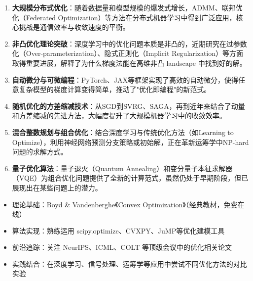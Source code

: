 \begin{conceptbox}[前沿研究方向]
\begin{enumerate}[label=\arabic*., leftmargin=2em]
    \item \textbf{大规模分布式优化}：随着数据量和模型规模的爆发式增长，ADMM、联邦优化（Federated Optimization）等方法在分布式机器学习中得到广泛应用，核心挑战是通信效率与收敛速度的平衡。
    \item \textbf{非凸优化理论突破}：深度学习中的优化问题本质是非凸的，近期研究在过参数化（Over-parameterization）、隐式正则化（Implicit Regularization）等方面取得重要进展，解释了为什么梯度法能在高维非凸 landscape 中找到好的解。
    \item \textbf{自动微分与可微编程}：PyTorch、JAX等框架实现了高效的自动微分，使得任意复杂模型的梯度计算变得简单，推动了"优化即编程"的新范式。
    \item \textbf{随机优化的方差缩减技术}：从SGD到SVRG、SAGA，再到近年来结合了动量和方差缩减的先进方法，大幅度提升了大规模机器学习中的收敛效率。
    \item \textbf{混合整数规划与组合优化}：结合深度学习与传统优化方法（如Learning to Optimize），利用神经网络预测分支策略或初始解，正在革新运筹学中NP-hard问题的求解方式。
    \item \textbf{量子优化算法}：量子退火（Quantum Annealing）和变分量子本征求解器（VQE）为组合优化问题提供了全新的计算范式，虽然仍处于早期阶段，但已展现出在某些问题上的潜力。
\end{enumerate}
\end{conceptbox}

\begin{notebox}[进一步学习建议]
\begin{itemize}[itemsep=0.3em]
    \item 理论基础：Boyd \& Vandenberghe《Convex Optimization》（经典教材，免费在线）
    \item 算法实现：熟练运用 scipy.optimize、CVXPY、JuMP等优化建模工具
    \item 前沿追踪：关注 NeurIPS、ICML、COLT 等顶级会议中的优化相关论文
    \item 实践结合：在深度学习、信号处理、运筹学等应用中尝试不同优化方法的对比实验
\end{itemize}
\end{notebox}


